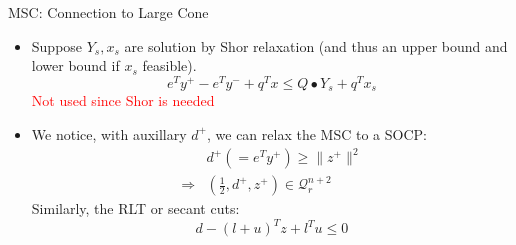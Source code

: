 \begin{frame}{MSC: Connection to Large Cone}
  \begin{itemize}
    \item Suppose \(Y_s, x_s\) are solution by Shor relaxation (and thus an upper bound and lower bound if \(x_s\) feasible).
          \[e^Ty^+ - e^Ty^- +  q^Tx \le Q\bullet Y_s  + q^T x_s\]
          \textcolor{red}{Not used since Shor is needed}
    \item We notice, with auxillary \(d^+\), we can relax the MSC to a SOCP:
          \[\begin{aligned}
                          & d^+ (= e^Ty^+) \ge \|z^+\|^2                    \\
              \Rightarrow & (\frac{1}{2}, d^+, z^+) \in \mathcal{Q}^{n+2}_r
            \end{aligned}
          \]
          Similarly, the RLT or secant cuts:
          \[
            d - (l + u)^Tz + l^Tu \le 0
          \]
  \end{itemize}

\end{frame}



